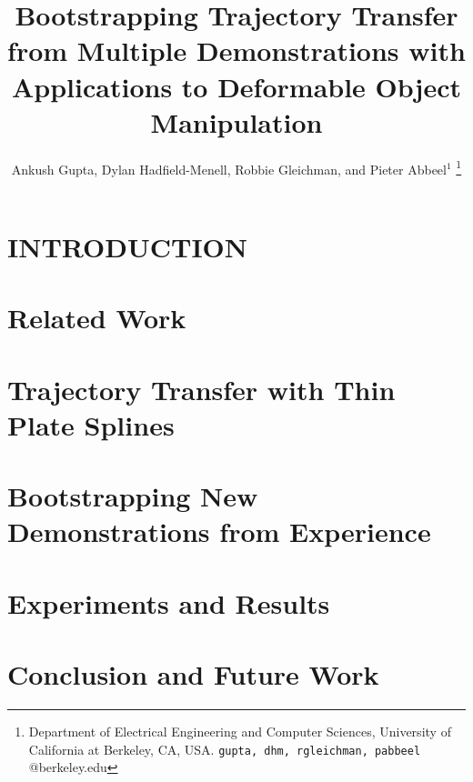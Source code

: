 \documentclass[letterpaper, 10 pt, conference]{ieeeconf}  %
\title{\LARGE \bf
Bootstrapping Trajectory Transfer from Multiple Demonstrations with Applications to Deformable Object Manipulation
}
\author{Ankush Gupta, Dylan Hadfield-Menell, Robbie Gleichman, and Pieter Abbeel$^{1}$%
\thanks{Department of Electrical Engineering and Computer Sciences, University of California at Berkeley, CA, USA.
  {\tt\small gupta, dhm, rgleichman, pabbeel} @berkeley.edu}}
\begin{document}

\maketitle
\thispagestyle{empty}
\pagestyle{empty}


\begin{abstract}

\end{abstract}


\section{INTRODUCTION}

\section{Related Work}


\section{Trajectory Transfer with Thin Plate Splines}


\section{Bootstrapping New Demonstrations from Experience}


\section{Experiments and Results}



\section{Conclusion and Future Work}


\addtolength{\textheight}{-12cm}   %
\end{document}
